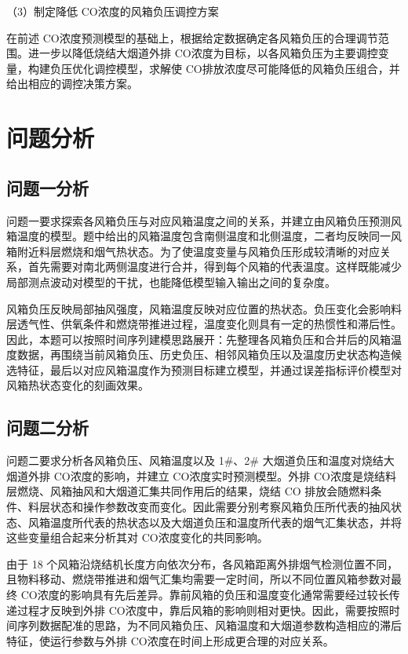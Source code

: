 \documentclass[UTF8,a4paper,zihao=-4]{ctexart}
\newcommand{\CO}{CO}
\begin{document}
（3）制定降低 \CO 浓度的风箱负压调控方案

在前述 \CO 浓度预测模型的基础上，根据给定数据确定各风箱负压的合理调节范围。进一步以降低烧结大烟道外排 \CO 浓度为目标，以各风箱负压为主要调控变量，构建负压优化调控模型，求解使 \CO 排放浓度尽可能降低的风箱负压组合，并给出相应的调控决策方案。

\section{问题分析}

\subsection{问题一分析}

问题一要求探索各风箱负压与对应风箱温度之间的关系，并建立由风箱负压预测风箱温度的模型。题中给出的风箱温度包含南侧温度和北侧温度，二者均反映同一风箱附近料层燃烧和烟气热状态。为了使温度变量与风箱负压形成较清晰的对应关系，首先需要对南北两侧温度进行合并，得到每个风箱的代表温度。这样既能减少局部测点波动对模型的干扰，也能降低模型输入输出之间的复杂度。

风箱负压反映局部抽风强度，风箱温度反映对应位置的热状态。负压变化会影响料层透气性、供氧条件和燃烧带推进过程，温度变化则具有一定的热惯性和滞后性。因此，本题可以按照时间序列建模思路展开：先整理各风箱负压和合并后的风箱温度数据，再围绕当前风箱负压、历史负压、相邻风箱负压以及温度历史状态构造候选特征，最后以对应风箱温度作为预测目标建立模型，并通过误差指标评价模型对风箱热状态变化的刻画效果。

\subsection{问题二分析}

问题二要求分析各风箱负压、风箱温度以及 1\#、2\# 大烟道负压和温度对烧结大烟道外排 \CO 浓度的影响，并建立 \CO 浓度实时预测模型。外排 \CO 浓度是烧结料层燃烧、风箱抽风和大烟道汇集共同作用后的结果，烧结 CO 排放会随燃料条件、料层状态和操作参数改变而变化\cite{wang2022coemission}。因此需要分别考察风箱负压所代表的抽风状态、风箱温度所代表的热状态以及大烟道负压和温度所代表的烟气汇集状态，并将这些变量组合起来分析其对 \CO 浓度变化的共同影响。

由于 18 个风箱沿烧结机长度方向依次分布，各风箱距离外排烟气检测位置不同，且物料移动、燃烧带推进和烟气汇集均需要一定时间，所以不同位置风箱参数对最终 \CO 浓度的影响具有先后差异。靠前风箱的负压和温度变化通常需要经过较长传递过程才反映到外排 \CO 浓度中，靠后风箱的影响则相对更快。因此，需要按照时间序列数据配准的思路，为不同风箱负压、风箱温度和大烟道参数构造相应的滞后特征，使运行参数与外排 \CO 浓度在时间上形成更合理的对应关系。
\end{document}
